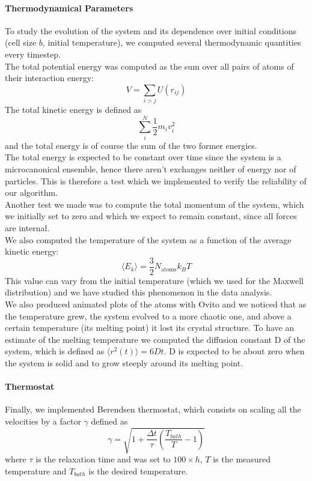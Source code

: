 \documentclass[10pt,a4paper,titlepage]{article}
\begin{document}
\paragraph{Thermodynamical Parameters} To study the evolution of the system and its dependence over initial conditions (cell size $b$, initial temperature), we computed several thermodynamic quantities every timestep. 
\\ The total potential energy was computed as the sum over all pairs of atoms of their interaction energy: 
\begin{equation}
V = \sum_{i>j} U(r_{ij})
\end{equation}
The total kinetic energy is defined as
\begin{equation}
\sum_{i}^{N} \frac{1}{2}m_i v_{i}^{2}
\end{equation}
and the total energy is of course the sum of the two former energies.
\\The total energy is expected to be constant over time since the system is a microcanonical ensemble, hence there aren't exchanges neither of energy nor of particles. This is therefore a test which we implemented to verify the reliability of our algorithm.
\\Another test we made was to compute the total momentum of the system, which we initially set to zero and which we expect to remain constant, since all forces are internal. \\
We also computed the temperature of the system as a function of the average kinetic energy: \begin{equation}
\langle E_k \rangle = \frac{3}{2}N_\text{atoms} k_B T
\end{equation} This value can vary from the initial temperature (which we used for the Maxwell distribution) and we have studied this phenomenon in the data analysis.
\\We also produced animated plots of the atoms with  Ovito and we noticed that as the temperature grew, the system evolved to a more chaotic one, and above a certain temperature (its melting point) it lost its crystal structure. To have an estimate of the melting temperature we computed the diffusion constant D of the system, which is defined as $\langle r^2(t) \rangle = 6Dt$. D is expected to be about zero when the system is solid and to grow steeply around its melting point. 
\paragraph{Thermostat}Finally, we implemented Berendsen thermostat, which consists on scaling all the velocities by a factor $\gamma$ defined as 
\begin{equation}
\gamma = \sqrt{1+ \frac{\Delta t}{\tau} \left (\frac{T_{bath}}{T}-1 \right) }
\end{equation}
where $\tau$ is the relaxation time and was set to $100 \times h$, $T$ is the measured temperature and $T_{bath}$ is the desired temperature.
\end{document}

